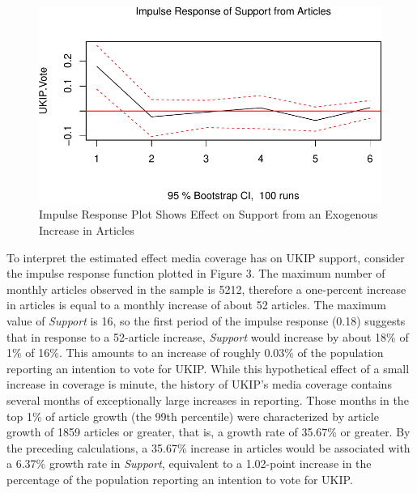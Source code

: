 \documentclass[12pt,]{article}
\makeatletter
\def\maxwidth{\ifdim\Gin@nat@width>\linewidth\linewidth
\else\Gin@nat@width\fi}
\let\Oldincludegraphics\includegraphics
\renewcommand{\includegraphics}[1]{\Oldincludegraphics[width=\maxwidth]{#1}}
\makeatother
\begin{document}
\begin{figure}[htbp]
\centering
\includegraphics{ukip_media_files/figure-latex/unnamed-chunk-8-1.pdf}
\caption{Impulse Response Plot Shows Effect on Support from an Exogenous
Increase in Articles}
\end{figure}

To interpret the estimated effect media coverage has on UKIP support,
consider the impulse response function plotted in Figure 3. The maximum
number of monthly articles observed in the sample is 5212, therefore a
one-percent increase in articles is equal to a monthly increase of about
52 articles. The maximum value of \emph{Support} is 16, so the first
period of the impulse response (0.18) suggests that in response to a
52-article increase, \emph{Support} would increase by about 18\% of 1\%
of 16\%. This amounts to an increase of roughly 0.03\% of the population
reporting an intention to vote for UKIP. While this hypothetical effect
of a small increase in coverage is minute, the history of UKIP's media
coverage contains several months of exceptionally large increases in
reporting. Those months in the top 1\% of article growth (the 99th
percentile) were characterized by article growth of 1859 articles or
greater, that is, a growth rate of 35.67\% or greater. By the preceding
calculations, a 35.67\% increase in articles would be associated with a
6.37\% growth rate in \emph{Support}, equivalent to a 1.02-point
increase in the percentage of the population reporting an intention to
vote for UKIP.
\end{document}

